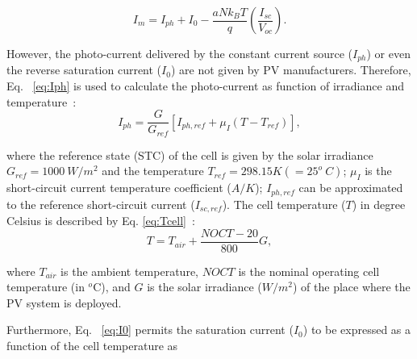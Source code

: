 \documentclass[review]{elsarticle}
\begin{document}
\begin{equation}
\label{eq:Imfinal}
I_{m} = I_{ph} + I_{0} - \dfrac{aNk_{B}T}{q} \left( \dfrac{I_{sc}}{V_{oc}} \right).  
\end{equation}

%
%
However, the photo-current delivered by the constant current source ($I_{ph}$) or even the reverse saturation current ($ I_{0} $) are not given by PV manufacturers. Therefore, Eq. ~\eqref{eq:Iph} is used to calculate the photo-current as function of irradiance and temperature~\citep{Villalva}:
\begin{equation}
\label{eq:Iph}
I_{ph}=\dfrac{G}{G_{ref}} \left[ I_{ph,ref} + \mu_{I} \left( T-T_{ref} \right)    \right], 
\end{equation}

\noindent where the reference state (STC) of the cell is given by the solar irradiance $ G_{ref}=1000\:W/m^{2} $ and the temperature $ T_{ref}=298.15 K (=25^{o}\:C) $; $ \mu_{I} $ is the short-circuit current temperature coefficient ($A/K$); %
$ I_{ph,ref} $ can be approximated to the reference short-circuit current ($ I_{sc,ref} $)\citep{Villalva}.
The cell temperature ($ T $) in degree Celsius is described by Eq. \ref{eq:Tcell}~\citep{Ross}:
\begin{equation}
\label{eq:Tcell}
T = T_{air} + \dfrac{NOCT-20}{800}G,
\end{equation}

\noindent where $ T_{air} $ is the ambient temperature, $NOCT$ is the nominal operating cell temperature (in $^{o}$C), and $G$ is the solar irradiance ($ W/m^{2} $) of the place where the PV system is deployed.

Furthermore, Eq. ~\eqref{eq:I0} permits the saturation current ($ I_{0} $) to be expressed as a function of the cell temperature as~\citep{Villalva} 
\end{document}
